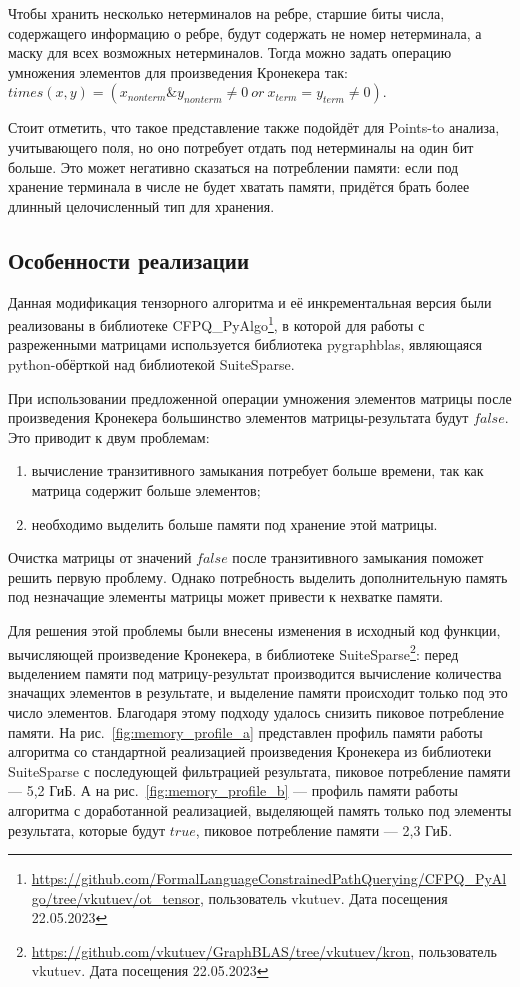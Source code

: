 Чтобы хранить несколько нетерминалов на ребре, старшие биты числа, содержащего информацию о ребре, будут содержать не номер нетерминала, а маску для всех возможных нетерминалов. Тогда можно задать операцию умножения элементов для произведения Кронекера так: $times(x, y) = (x_{nonterm} \& y_{nonterm} \neq 0 \ or\ x_{term} = y_{term} \neq 0)$.


Стоит отметить, что такое представление также подойдёт для Points-to анализа, учитывающего поля, но оно потребует отдать под нетерминалы на один бит больше. Это может негативно сказаться на потреблении памяти: если под хранение терминала в числе не будет хватать памяти, придётся брать более длинный целочисленный тип для хранения.


\subsection{Особенности реализации}

Данная модификация тензорного алгоритма и её инкрементальная версия были реализованы в библиотеке CFPQ\_PyAlgo\footnote{\url{https://github.com/FormalLanguageConstrainedPathQuerying/CFPQ_PyAlgo/tree/vkutuev/ot_tensor}, пользователь vkutuev. Дата посещения 22.05.2023}, в которой для работы с разреженными матрицами используется библиотека pygraphblas, являющаяся python-обёрткой над библиотекой SuiteSparse. 

При использовании предложенной операции умножения элементов матрицы после произведения Кронекера большинство элементов матрицы-результата будут $false$. Это приводит к двум проблемам: 
\begin{enumerate}
    \item вычисление транзитивного замыкания потребует больше времени, так как матрица содержит больше элементов;
    \item необходимо выделить больше памяти под хранение этой матрицы.
\end{enumerate}

Очистка матрицы от значений $false$ после транзитивного замыкания поможет решить первую проблему. Однако потребность выделить дополнительную память под незначащие элементы матрицы может привести к нехватке памяти. 

Для решения этой проблемы были внесены изменения в исходный код функции, вычисляющей произведение Кронекера, в библиотеке SuiteSparse\footnote{\url{https://github.com/vkutuev/GraphBLAS/tree/vkutuev/kron}, пользователь vkutuev. Дата посещения 22.05.2023}: перед выделением памяти под матрицу-результат производится вычисление количества значащих элементов в результате, и выделение памяти происходит только под это число элементов. Благодаря этому подходу удалось снизить пиковое потребление памяти. На рис.~\ref{fig:memory_profile_a} представлен профиль памяти работы алгоритма со стандартной реализацией произведения Кронекера из библиотеки SuiteSparse с последующей фильтрацией результата, пиковое потребление памяти --- 5,2 ГиБ. А на рис.~\ref{fig:memory_profile_b} --- профиль памяти работы алгоритма с доработанной реализацией, выделяющей память только под элементы результата, которые будут $true$, пиковое потребление памяти --- 2,3 ГиБ.

